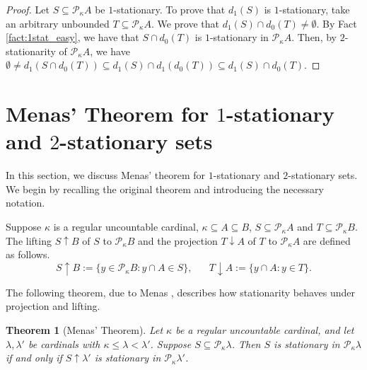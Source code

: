\documentclass[a4paper,12pt,reqno,oneside]{amsart}
\theoremstyle{plain}
\newtheorem{theorem}{Theorem}[section]
\newcommand{\mcal}{\mathcal}
\begin{document}

\begin{proof} Let $S \subseteq \mcal{P}_\kappa A$ be $1$-stationary. To prove that $d_1 (S)$ is $1$-stationary, take an arbitrary unbounded $T \subseteq \mcal{P}_\kappa A$. We prove that $d_1(S) \cap d_0(T) \neq \emptyset$.
By Fact \ref{fact:1stat_easy}, we have that $S \cap d_0(T)$ is $1$-stationary in $\mcal{P}_\kappa A$. Then, by $2$-stationarity of $\mcal{P}_\kappa A$, we have $\emptyset \neq d_1 ( S \cap d_0 (T) ) \subseteq d_1 (S) \cap d_1( d_0 (T) ) \subseteq  d_1(S) \cap d_0(T)$.
\end{proof}


\section{Menas' Theorem for $1$-stationary and $2$-stationary sets} \label{sec:Menas}

In this section, we discuss Menas' theorem for $1$-stationary and $2$-stationary sets. We begin by recalling the original theorem and introducing the necessary notation.

Suppose $\kappa$ is a regular uncountable cardinal, $\kappa \subseteq A \subseteq B$, $S \subseteq \mcal{P}_{\kappa}A$ and $T \subseteq \mcal{P}_{\kappa}B$. The lifting $S \uparrow B$ of $S$ to $\mcal{P}_{\kappa}B$ and the projection $T \downarrow A$ of $T$ to $\mcal{P}_\kappa A$ are defined as follows.
\[
S \uparrow B := \{ y \in \mcal{P}_{\kappa}B : y \cap A \in S \}, \hspace{20pt}
T \downarrow A := \{ y \cap A : y \in T \}.
\]
 
The following theorem, due to Menas \cite{Me}, describes how stationarity behaves under projection and lifting.


\begin{theorem}[Menas' Theorem]\label{menas}
Let $\kappa$ be a regular uncountable cardinal, and let $\lambda , \lambda '$ be cardinals with $\kappa \leq \lambda < \lambda'$. Suppose $S \subseteq \mcal{P}_{\kappa}\lambda$. Then $S$ is stationary in $\mcal{P}_{\kappa}\lambda$ if and only if $S \uparrow \lambda'$ is stationary in $\mcal{P}_{\kappa}{\lambda'}$.
\end{theorem}
\end{document}

